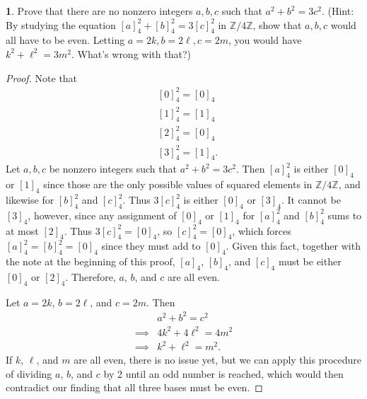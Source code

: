 \documentclass{article}
\theoremstyle{definition}
\newtheorem{ex}{}[section]
\begin{document}
\begin{ex}
	Prove that there are no nonzero integers $a, b, c$ such that $a^2 + b^2 = 3c^2$.
	(Hint: By studying the equation $[a]_4^2 + [b]_4^2 = 3[c]_4^2$ in $\mathbb{Z}/4 \mathbb{Z}$, show that $a, b, c$ would all have to be even. Letting $a = 2k, b = 2\ell, c = 2m$, you would have $k^2 + \ell^2 = 3m^2$. What's wrong with that?)
\end{ex}
\begin{proof}
	Note that \begin{align*}
		 & [0]_4^2 = [0]_4  \\
		 & [1]_4^2 = [1]_4  \\
		 & [2]_4^2 = [0]_4  \\
		 & [3]_4^2 = [1]_4.
	\end{align*}
	Let $a, b, c$ be nonzero integers such that $a^2 + b^2 = 3c^2$.
	Then $[a]_4^2$ is either $[0]_4$ or $[1]_4$ since those are the only possible values of squared elements in $\mathbb{Z}/4 \mathbb{Z}$, and likewise for $[b]_4^2$ and $[c]_4^2$.
	Thus $3[c]_4^2$ is either $[0]_4$ or $[3]_4$.
	It cannot be $[3]_4$, however, since any assignment of $[0]_4$ or $[1]_4$ for $[a]_4^2$ and $[b]_4^2$ sums to at most $[2]_4$.
	Thus $3[c]_4^2 = [0]_4$, so $[c]_4^2 = [0]_4$, which forces $[a]_4^2 = [b]_4^2 = [0]_4$ since they must add to $[0]_4$.
	Given this fact, together with the note at the beginning of this proof, $[a]_4$, $[b]_4$, and $[c]_4$ must be either $[0]_4$ or $[2]_4$.
	Therefore, $a$, $b$, and $c$ are all even.

	Let $a = 2k$, $b = 2\ell$, and $c = 2m$.
	Then \begin{align*}
		         & a^2 + b^2 = c^2       \\
		\implies & 4k^2 + 4\ell^2 = 4m^2 \\
		\implies & k^2 + \ell^2 = m^2.
	\end{align*}
	If $k$, $\ell$, and $m$ are all even, there is no issue yet, but we can apply this procedure of dividing $a$, $b$, and $c$ by 2 until an odd number is reached, which would then contradict our finding that all three bases must be even.
\end{proof}
\end{document}
